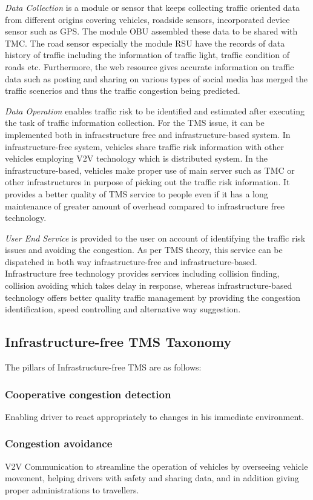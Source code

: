 \documentclass[conference]{IEEEtran}
\begin{document}
\textit{Data Collection} is a module or sensor that keeps collecting traffic oriented data from different origins covering vehicles, roadside sensors, incorporated device sensor such as GPS. The module OBU assembled these data to be shared with TMC. The road sensor especially the module RSU have the records of data history of traffic including the information of traffic light, traffic condition of roads etc. Furthermore, the web resource gives accurate information on traffic data such as posting and sharing on various types of social media has merged the traffic scenerios and thus the traffic congestion being predicted.

\textit{Data Operation} enables traffic risk to be identified and estimated after executing the task of traffic information collection. For the TMS issue, it can be implemented both in infracstructure free and infrastructure-based system. In infrastructure-free system, vehicles share traffic risk information with other vehicles employing V2V technology which is distributed system. In the infrastructure-based, vehicles make proper use of main server such as TMC or other infrastructures in purpose of picking out the traffic risk information. It provides a better quality of  TMS service to people even if it has a long maintenance of greater amount of overhead compared to infrastructure free technology. 

\textit{User End Service} is provided to the user on account of identifying the traffic risk issues and avoiding the congestion. As per TMS theory, this service can be dispatched in both way infrastructure-free and infrastructure-based. Infrastructure free technology provides services including collision finding, collision avoiding which takes delay in response, whereas infrastructure-based technology offers better quality traffic management by providing the congestion identification, speed controlling and alternative way suggestion.

\subsection{Infrastructure-free TMS Taxonomy}
The pillars of Infrastructure-free TMS are as follows: 
\subsubsection{Cooperative congestion detection}
Enabling driver to react appropriately to changes in his immediate environment.
\subsubsection{Congestion avoidance}
V2V Communication  to streamline the operation of vehicles by overseeing vehicle movement, helping drivers with safety and sharing data, and in addition giving proper administrations to travellers.
\end{document}
